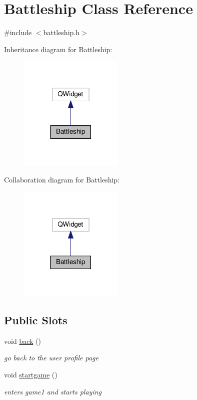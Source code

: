 \hypertarget{classBattleship}{}\section{Battleship Class Reference}
\label{classBattleship}


{\ttfamily \#include $<$battleship.\+h$>$}



Inheritance diagram for Battleship\+:
\nopagebreak
\begin{figure}[H]
\begin{center}
\leavevmode
\includegraphics[width=140pt]{classBattleship__inherit__graph}
\end{center}
\end{figure}


Collaboration diagram for Battleship\+:
\nopagebreak
\begin{figure}[H]
\begin{center}
\leavevmode
\includegraphics[width=140pt]{classBattleship__coll__graph}
\end{center}
\end{figure}
\subsection*{Public Slots}
\begin{DoxyCompactItemize}
\item 
void \hyperlink{classBattleship_a37515bbb9fe274e559315cb177fe13e5}{back} ()
\begin{DoxyCompactList}\small\item\em go back to the user profile page \end{DoxyCompactList}\item 
void \hyperlink{classBattleship_abd2c4b47572e707f91e5fef6790a48a5}{startgame} ()
\begin{DoxyCompactList}\small\item\em enters game1 and starts playing \end{DoxyCompactList}\end{DoxyCompactItemize}
